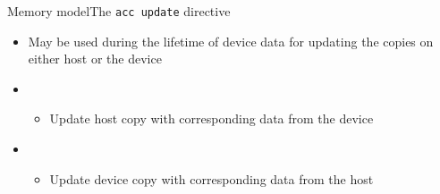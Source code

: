 \documentclass[12pt,aspectratio=169]{beamer}
\begin{document}
\begin{frame}[fragile]{Memory model}{The \texttt{acc update} directive}
  \begin{itemize}
  \item May be used during the lifetime of device data for updating the copies on either host or the device
    \vfill
  \item {}
    \begin{itemize}
    \item Update host copy with corresponding data from the device
    \end{itemize}
    \vfill
  \item {}
    \begin{itemize}
    \item Update device copy with corresponding data from the host
    \end{itemize}
  \end{itemize}
\end{frame}
\end{document}
